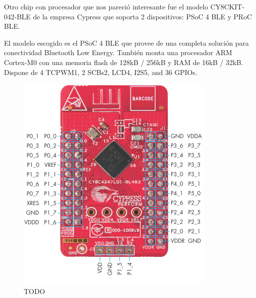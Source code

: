 Otro chip con procesador que nos pareció interesante fue el modelo CY8CKIT-042-BLE de la empresa Cypress que soporta 2 dispositivos: PSoC 4 BLE y  PRoC BLE.

El modelo escogido es el PSoC 4 BLE que provee de una completa solución para conectividad Bluetooth Low Energy. También monta una procesador ARM Cortex-M0 con una memoria flash de 128kB / 256kB y RAM de 16kB / 32kB. Dispone de 4 TCPWM1, 2 SCBs2, LCD4, I2S5, and 36 GPIOs.

\begin{figure}[h]%
	\centering
    \includegraphics[width=\linewidth]{figures/cypress_psoc.PNG} %

    \caption[TODO]{TODO}

   \label{figuraCypressPeque}
\end{figure}

